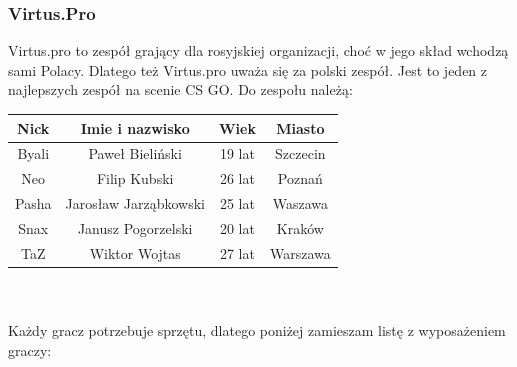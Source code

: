 \documentclass{article}
\begin{document}
\subsubsection{Virtus.Pro}
Virtus.pro to zespół grający dla rosyjskiej organizacji, choć w jego skład wchodzą sami Polacy. Dlatego też Virtus.pro uważa się za polski zespół. Jest to jeden z najlepszych zespół na scenie CS GO. Do zespołu należą:\\
\label{Tabela 1}
\begin{tabular}{|c|c|c|c|} \hline
Nick & Imie i nazwisko & Wiek & Miasto\\
\hline
Byali & Paweł Bieliński & 19 lat & Szczecin\\
\hline
Neo & Filip Kubski & 26 lat & Poznań\\
\hline
Pasha & Jarosław Jarząbkowski & 25 lat & Waszawa\\
\hline
Snax & Janusz Pogorzelski & 20 lat & Kraków\\
\hline
TaZ & Wiktor Wojtas & 27 lat & Warszawa\\
\hline
\end{tabular}\\ \\
Każdy gracz potrzebuje sprzętu, dlatego poniżej zamieszam listę z wyposażeniem graczy:
\end{document}
